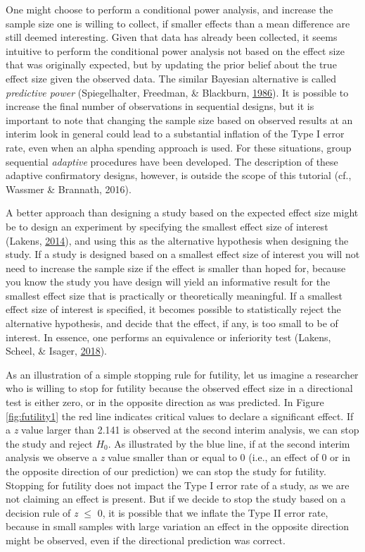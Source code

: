 \documentclass[
  english,
  ,jou, a4paper,floatsintext]{apa6}
\begin{document}
One might choose to perform a conditional power analysis, and increase the sample size one is willing to collect, if smaller effects than a mean difference are still deemed interesting. Given that data has already been collected, it seems intuitive to perform the conditional power analysis not based on the effect size that was originally expected, but by updating the prior belief about the true effect size given the observed data. The similar Bayesian alternative is called \emph{predictive power} (Spiegelhalter, Freedman, \& Blackburn, \protect\hyperlink{ref-spiegelhalter_monitoring_1986}{1986}). It is possible to increase the final number of observations in sequential designs, but it is important to note that changing the sample size based on observed results at an interim look in general could lead to a substantial inflation of the Type I error rate, even when an alpha spending approach is used. For these situations, group sequential \emph{adaptive} procedures have been developed. The description of these adaptive confirmatory designs, however, is outside the scope of this tutorial (cf., Wassmer \& Brannath, 2016).

A better approach than designing a study based on the expected effect size might be to design an experiment by specifying the smallest effect size of interest (Lakens, \protect\hyperlink{ref-lakens_performing_2014}{2014}), and using this as the alternative hypothesis when designing the study. If a study is designed based on a smallest effect size of interest you will not need to increase the sample size if the effect is smaller than hoped for, because you know the study you have design will yield an informative result for the smallest effect size that is practically or theoretically meaningful. If a smallest effect size of interest is specified, it becomes possible to statistically reject the alternative hypothesis, and decide that the effect, if any, is too small to be of interest. In essence, one performs an equivalence or inferiority test (Lakens, Scheel, \& Isager, \protect\hyperlink{ref-lakens_equivalence_2018}{2018}).

As an illustration of a simple stopping rule for futility, let us imagine a researcher who is willing to stop for futility because the observed effect size in a directional test is either zero, or in the opposite direction as was predicted. In Figure \ref{fig:futility1} the red line indicates critical values to declare a significant effect. If a \emph{z} value larger than 2.141 is observed at the second interim analysis, we can stop the study and reject \(H_0\). As illustrated by the blue line, if at the second interim analysis we observe a \emph{z} value smaller than or equal to 0 (i.e., an effect of 0 or in the opposite direction of our prediction) we can stop the study for futility. Stopping for futility does not impact the Type I error rate of a study, as we are not claiming an effect is present. But if we decide to stop the study based on a decision rule of \emph{z} \(\leq\) 0, it is possible that we inflate the Type II error rate, because in small samples with large variation an effect in the opposite direction might be observed, even if the directional prediction was correct.
\end{document}
